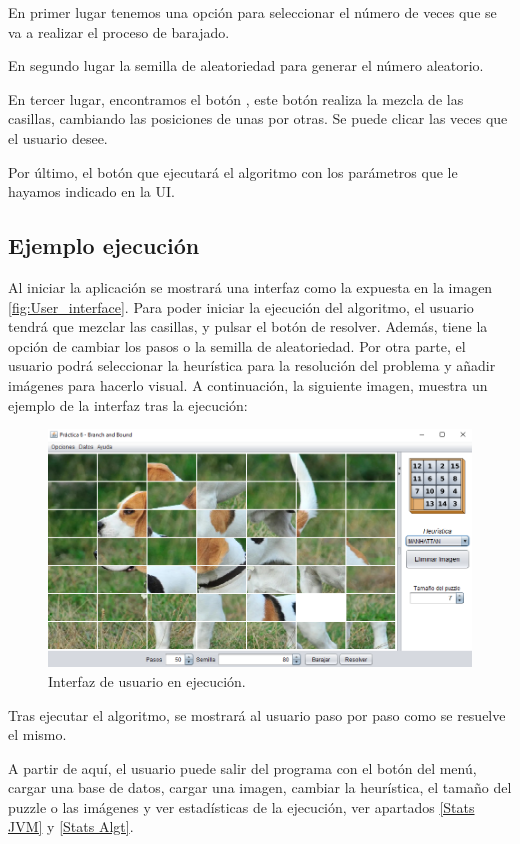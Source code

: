 En primer lugar tenemos una opción para seleccionar el número de veces que se va a realizar el proceso de barajado.\bigskip

En segundo lugar la semilla de aleatoriedad para generar el número aleatorio. \bigskip

En tercer lugar, encontramos el botón , este botón realiza la mezcla de las casillas, cambiando las posiciones de unas por otras. Se puede clicar las veces que el usuario desee.\bigskip

Por último, el botón  que ejecutará el algoritmo con los parámetros que le hayamos indicado en la UI.

\subsection{Ejemplo ejecución}

Al iniciar la aplicación se mostrará una interfaz como la expuesta en la imagen \ref{fig:User_interface}. Para poder iniciar la ejecución del algoritmo, el usuario tendrá que mezclar las casillas, y pulsar el botón de resolver. Además, tiene la opción de cambiar los pasos o la semilla de aleatoriedad. Por otra parte, el usuario podrá seleccionar la heurística para la resolución del problema y añadir imágenes para hacerlo visual. A continuación, la siguiente imagen, muestra un ejemplo de la interfaz tras la ejecución:

\begin{figure}[!h]
    \centering
    \includegraphics[width=\linewidth]{Usage/img/ejecucion.png}
    \caption{Interfaz de usuario en ejecución.}
    \label{fig:Ejemplo ejecución}
\end{figure}

Tras ejecutar el algoritmo, se mostrará al usuario paso por paso como se resuelve el mismo.  \bigskip

A partir de aquí, el usuario puede salir del programa con el botón del menú, cargar una base de datos, cargar una imagen, cambiar la heurística, el tamaño del puzzle o las imágenes y ver estadísticas de la ejecución, ver apartados \ref{Stats JVM} y \ref{Stats Algt}.
